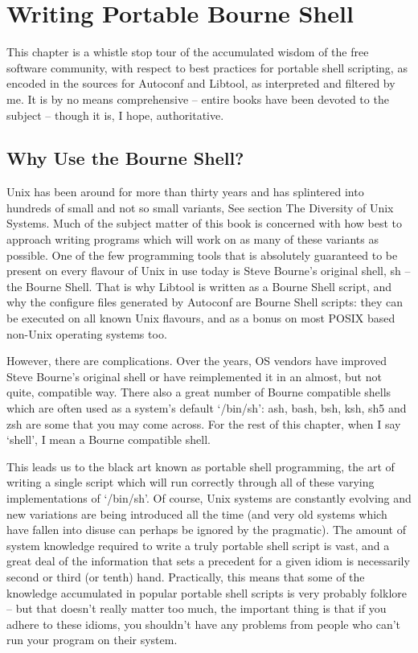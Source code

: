 \chapter{Writing Portable Bourne Shell}\label{C_Writing_Portable_Bourne_Shell}

This chapter is a whistle stop tour of the accumulated wisdom of the free software community, with respect to best practices for portable shell scripting, as encoded in the sources for Autoconf and Libtool, as interpreted and filtered by me. It is by no means comprehensive -- entire books have been devoted to the subject -- though it is, I hope, authoritative. 

\section{Why Use the Bourne Shell?}

Unix has been around for more than thirty years and has splintered into hundreds of small and not so small variants, See section The Diversity of Unix Systems. Much of the subject matter of this book is concerned with how best to approach writing programs which will work on as many of these variants as possible. One of the few programming tools that is absolutely guaranteed to be present on every flavour of Unix in use today is Steve Bourne's original shell, sh -- the Bourne Shell. That is why Libtool is written as a Bourne Shell script, and why the configure files generated by Autoconf are Bourne Shell scripts: they can be executed on all known Unix flavours, and as a bonus on most POSIX based non-Unix operating systems too.

However, there are complications. Over the years, OS vendors have improved Steve Bourne's original shell or have reimplemented it in an almost, but not quite, compatible way. There also a great number of Bourne compatible shells which are often used as a system's default `/bin/sh': ash, bash, bsh, ksh, sh5 and zsh are some that you may come across. For the rest of this chapter, when I say `shell', I mean a Bourne compatible shell.

This leads us to the black art known as portable shell programming, the art of writing a single script which will run correctly through all of these varying implementations of `/bin/sh'. Of course, Unix systems are constantly evolving and new variations are being introduced all the time (and very old systems which have fallen into disuse can perhaps be ignored by the pragmatic). The amount of system knowledge required to write a truly portable shell script is vast, and a great deal of the information that sets a precedent for a given idiom is necessarily second or third (or tenth) hand. Practically, this means that some of the knowledge accumulated in popular portable shell scripts is very probably folklore -- but that doesn't really matter too much, the important thing is that if you adhere to these idioms, you shouldn't have any problems from people who can't run your program on their system. 

